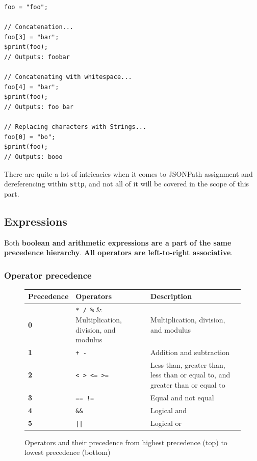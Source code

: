 \documentclass[]{full}
\theoremstyle{definition}
\begin{document}
\begin{verbatim}
foo = "foo";

// Concatenation...
foo[3] = "bar";
$print(foo);
// Outputs: foobar

// Concatenating with whitespace...
foo[4] = "bar";
$print(foo);
// Outputs: foo bar

// Replacing characters with Strings...
foo[0] = "bo";
$print(foo);
// Outputs: booo
\end{verbatim}

There are quite a lot of intricacies when it comes to JSONPath assignment and dereferencing within \verb|sttp|, and not all of it will be covered in the scope of this part.

\subsection{Expressions}

Both \textbf{boolean and arithmetic expressions are a part of the same precedence hierarchy}. \textbf{All operators are left-to-right associative}.

\subsubsection{Operator precedence}

\begin{figure}[H]
    \begin{center}
        \begin{tabular}{| m{2cm} | m{2cm} | m{5cm} |}
            \hline
            Precedence & Operators & Description\\
            \hline
            \textbf{0} & \verb|* / %| & Multiplication, division, and modulus\\
            \hline
            \textbf{1} & \verb|+ -| & Addition and subtraction\\
            \hline
            \textbf{2} & \verb|< > <= >=| & Less than, greater than, less than or equal to, and greater than or equal to\\
            \hline
            \textbf{3} & \verb|== !=| & Equal and not equal\\
            \hline
            \textbf{4} & \verb|&&| & Logical and\\
            \hline
            \textbf{5} & \verb+||+ & Logical or\\
            \hline
        \end{tabular}
    \end{center}
    \caption{Operators and their precedence from highest precedence (top) to lowest precedence (bottom)}
\end{figure}
\end{document}
